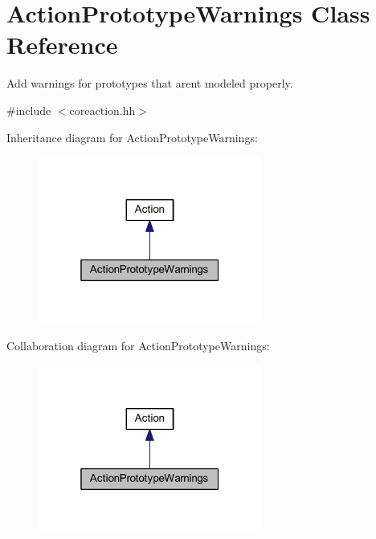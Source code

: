 \hypertarget{class_action_prototype_warnings}{}\section{Action\+Prototype\+Warnings Class Reference}
\label{class_action_prototype_warnings}


Add warnings for prototypes that aren\textquotesingle{}t modeled properly.  




{\ttfamily \#include $<$coreaction.\+hh$>$}



Inheritance diagram for Action\+Prototype\+Warnings\+:
\nopagebreak
\begin{figure}[H]
\begin{center}
\leavevmode
\includegraphics[width=208pt]{class_action_prototype_warnings__inherit__graph}
\end{center}
\end{figure}


Collaboration diagram for Action\+Prototype\+Warnings\+:
\nopagebreak
\begin{figure}[H]
\begin{center}
\leavevmode
\includegraphics[width=208pt]{class_action_prototype_warnings__coll__graph}
\end{center}
\end{figure}

